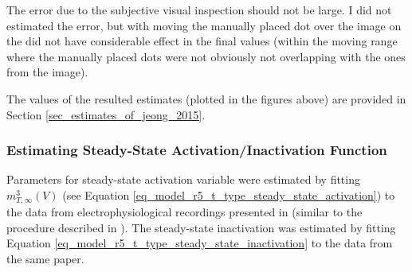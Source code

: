 \documentclass[../../workflow.tex]{subfiles}
\begin{document}
\begin{note}
    The error due to the subjective visual inspection should not be large. I did not estimated the
    error, but with moving the manually placed dot over the image on the did not have considerable
    effect in the final values (within the moving range where the manually placed dots were not
    obviously not overlapping with the ones from the image).

    The values of the resulted estimates (plotted in the figures above) are provided in
    Section \ref{sec_estimates_of_jeong_2015}.
\end{note}


\subsubsection{Estimating Steady-State Activation/Inactivation Function}

Parameters for steady-state activation variable were estimated by fitting
$m_{T,\infty}^3(V)$ (see Equation \ref{eq_model_r5_t_type_steady_state_activation}) to the data
from electrophysiological recordings presented in \cite{jeongCaa1TFlyTtype2015} (similar to
the procedure described in \cite{coulterCalciumCurrentsRat1989}). The steady-state inactivation
was estimated by fitting Equation \ref{eq_model_r5_t_type_steady_state_inactivation} to the
data from the same paper.
\end{document}
